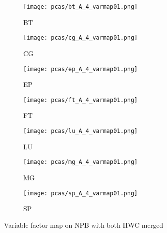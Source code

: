 \begin{figure}
    \centering
    \begin{subfigure}[b]{0.3\textwidth}
        \texttt{[image: pcas/bt\_A\_4\_varmap01.png]}
        \caption{BT}
        \label{fig:bt_pcv_hwc1}
    \end{subfigure}
    \quad
    \begin{subfigure}[b]{0.3\textwidth}
        \texttt{[image: pcas/cg\_A\_4\_varmap01.png]}
        \caption{CG}
        \label{fig:cg_pcv_hwc1}
    \end{subfigure}
    \quad
    \begin{subfigure}[b]{0.3\textwidth}
        \texttt{[image: pcas/ep\_A\_4\_varmap01.png]}
        \caption{EP}
        \label{fig:ep_pcv_hwc1}
    \end{subfigure}
    
    \begin{subfigure}[b]{0.3\textwidth}
        \texttt{[image: pcas/ft\_A\_4\_varmap01.png]}
        \caption{FT}
        \label{fig:ft_pcv_hwc1}
    \end{subfigure}
    \quad
    \begin{subfigure}[b]{0.3\textwidth}
        \texttt{[image: pcas/lu\_A\_4\_varmap01.png]}
        \caption{LU}
        \label{fig:lu_pcv_hwc1}
    \end{subfigure}
    \quad
    \begin{subfigure}[b]{0.3\textwidth}
        \texttt{[image: pcas/mg\_A\_4\_varmap01.png]}
        \caption{MG}
        \label{fig:mg_pcv_hwc1}
    \end{subfigure}

    \begin{subfigure}[b]{0.3\textwidth}
        \texttt{[image: pcas/sp\_A\_4\_varmap01.png]}
        \caption{SP}
        \label{fig:sp_pcv_hwc1}
    \end{subfigure}
    \caption{Variable factor map on NPB with both HWC merged}
\end{figure}

